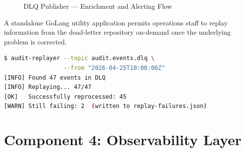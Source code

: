 \begin{figure}[H]
\centering
{}
\caption{DLQ Publisher --- Enrichment and Alerting Flow}
\end{figure}

A standalone GoLang utility application permits operations staff to replay information from 
the dead-letter repository on-demand once the underlying problem is corrected.

\begin{lstlisting}[language=bash, caption={DLQ Replayer CLI --- Sample Usage}]
$ audit-replayer --topic audit.events.dlq \
                 --from "2026-04-25T10:00:00Z"
[INFO] Found 47 events in DLQ
[INFO] Replaying... 47/47
[OK]   Successfully reprocessed: 45
[WARN] Still failing: 2  (written to replay-failures.json)
\end{lstlisting}

\section{Component 4: Observability Layer}

